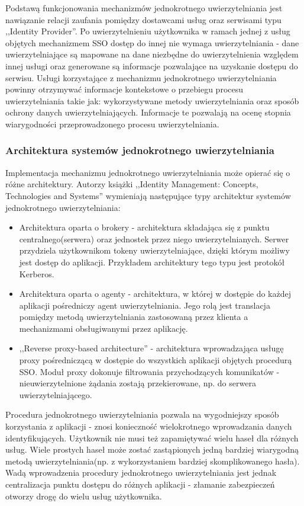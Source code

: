 	Podstawą funkcjonowania mechanizmów jednokrotnego uwierzytelniania jest nawiązanie relacji zaufania pomiędzy dostawcami usług oraz serwisami typu ,,Identity Provider''. Po uwierzytelnieniu użytkownika w ramach jednej z usług objętych mechanizmem SSO dostęp do innej nie wymaga uwierzytelniania - dane uwierzytelniające są mapowane na dane niezbędne do uwierzytelnienia względem innej usługi oraz generowane są informacje pozwalające na uzyskanie dostępu do serwisu. Usługi korzystające z mechanizmu jednokrotnego uwierzytelniania powinny otrzymywać informacje kontekstowe o przebiegu procesu uwierzytelniania takie jak: wykorzystywane metody uwierzytelniania oraz sposób ochrony danych uwierzytelniających. Informacje te pozwalają na ocenę stopnia wiarygodności przeprowadzonego procesu uwierzytelniania.

	\subsubsection{Architektura systemów jednokrotnego uwierzytelniania}

		Implementacja mechanizmu jednokrotnego uwierzytelniania może opierać się o różne architektury. Autorzy książki ,,Identity Management: Concepts, Technologies and Systems''\cite{Bertino11} wymieniają następujące typy architektur systemów jednokrotnego uwierzytelniania:

		\begin{itemize}
		  \item Architektura oparta o brokery - architektura składająca się z punktu centralnego(serwera) oraz jednostek przez niego uwierzytelnianych. Serwer przydziela użytkownikom tokeny uwierzytelniające, dzięki którym możliwy jest dostęp do aplikacji. Przykładem architektury tego typu jest protokół Kerberos. 
		  \item Architektura oparta o agenty - architektura, w której w dostępie do każdej aplikacji pośredniczy agent uwierzytelniania. Jego rolą jest translacja pomiędzy metodą uwierzytelniania zastosowaną przez klienta a mechanizmami obsługiwanymi przez aplikację.
		  \item ,,Reverse proxy-based architecture'' - architektura wprowadzająca usługę proxy pośredniczącą w dostępie do wszystkich aplikacji objętych procedurą SSO. Moduł proxy dokonuje filtrowania przychodzących komunikatów - nieuwierzytelnione żądania zostają przekierowane, np. do serwera uwierzytelniającego.
		\end{itemize}
		  
		Procedura jednokrotnego uwierzytelniania pozwala na wygodniejszy sposób korzystania z aplikacji - znosi konieczność wielokrotnego wprowadzania danych identyfikujących. Użytkownik nie musi też zapamiętywać wielu haseł dla różnych usług. Wiele prostych haseł może zostać zastąpionych jedną bardziej wiarygodną metodą uwierzytelniania(np. z wykorzystaniem bardziej skomplikowanego hasła). Wadą wprowadzenia procedury jednokrotnego uwierzytelniania jest jednak centralizacja punktu dostępu do różnych aplikacji - złamanie zabezpieczeń otworzy drogę do wielu usług użytkownika.


